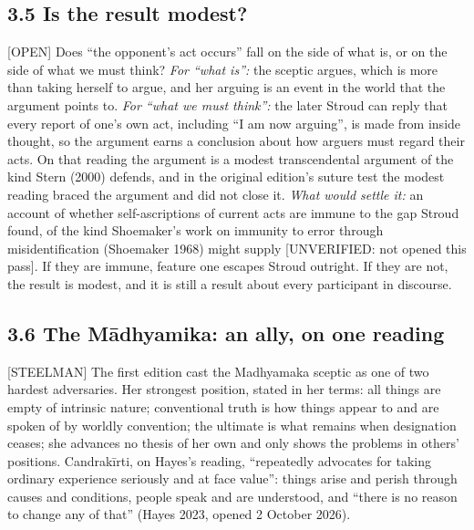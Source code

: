 \documentclass[11pt]{article}
\newcommand{\register}[1]{{\ttfamily\small #1}}
\begin{document}
\subsection*{3.5 Is the result modest?}

\register{[OPEN]} Does ``the opponent's act occurs'' fall on the side of what is, or on the side of what we must think? \emph{For ``what is'':} the sceptic argues, which is more than taking herself to argue, and her arguing is an event in the world that the argument points to. \emph{For ``what we must think'':} the later Stroud can reply that every report of one's own act, including ``I am now arguing'', is made from inside thought, so the argument earns a conclusion about how arguers must regard their acts. On that reading the argument is a modest transcendental argument of the kind Stern (2000) defends, and in the original edition's suture test the modest reading braced the argument and did not close it. \emph{What would settle it:} an account of whether self-ascriptions of current acts are immune to the gap Stroud found, of the kind Shoemaker's work on immunity to error through misidentification (Shoemaker 1968) might supply [UNVERIFIED: not opened this pass]. If they are immune, feature one escapes Stroud outright. If they are not, the result is modest, and it is still a result about every participant in discourse.

\subsection*{3.6 The Mādhyamika: an ally, on one reading}

\register{[STEELMAN]} The first edition cast the Madhyamaka sceptic as one of two hardest adversaries. Her strongest position, stated in her terms: all things are empty of intrinsic nature; conventional truth is how things appear to and are spoken of by worldly convention; the ultimate is what remains when designation ceases; she advances no thesis of her own and only shows the problems in others' positions. Candrakīrti, on Hayes's reading, ``repeatedly advocates for taking ordinary experience seriously and at face value'': things arise and perish through causes and conditions, people speak and are understood, and ``there is no reason to change any of that'' (Hayes 2023, opened 2 October 2026).
\end{document}
